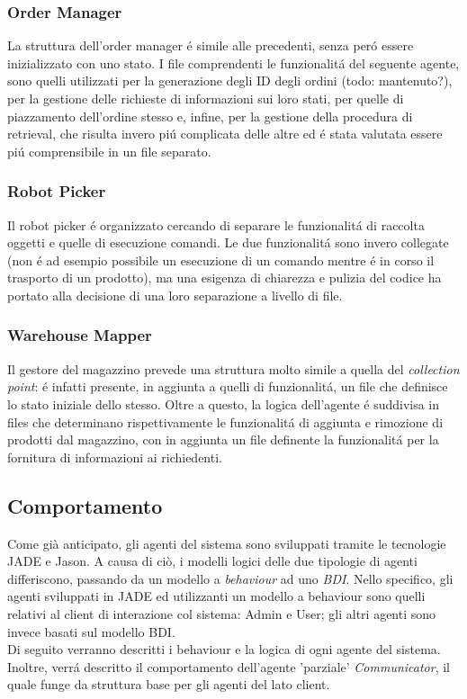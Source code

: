 \subsubsection{Order Manager}
La struttura dell'order manager \'e simile alle precedenti, senza per\'o essere inizializzato con uno stato. I file comprendenti le funzionalit\'a del seguente agente, sono quelli utilizzati per la generazione degli ID degli ordini (todo: mantenuto?), per la gestione delle richieste di informazioni sui loro stati, per quelle di piazzamento dell'ordine stesso e, infine, per la gestione della procedura di retrieval, che risulta invero pi\'u complicata delle altre ed \'e stata valutata essere pi\'u comprensibile in un file separato.%

\subsubsection{Robot Picker}
Il robot picker \'e organizzato cercando di separare le funzionalit\'a di raccolta oggetti e quelle di esecuzione comandi. Le due funzionalit\'a sono invero collegate (non \'e ad esempio possibile un esecuzione di un comando mentre \'e in corso il trasporto di un prodotto), ma una esigenza di chiarezza e pulizia del codice ha portato alla decisione di una loro separazione a livello di file.%

\subsubsection{Warehouse Mapper}
Il gestore del magazzino prevede una struttura molto simile a quella del \textit{collection point}: \'e infatti presente, in aggiunta a quelli di funzionalit\'a, un file che definisce lo stato iniziale dello stesso. Oltre a questo, la logica dell'agente \'e suddivisa in files che determinano rispettivamente le funzionalit\'a di aggiunta e rimozione di prodotti dal magazzino, con in aggiunta un file definente la funzionalit\'a per la fornitura di informazioni ai richiedenti.

\subsection{Comportamento}

Come già anticipato, gli agenti del sistema sono sviluppati tramite le tecnologie JADE e Jason. A causa di ciò, i modelli logici delle due tipologie di agenti differiscono, passando da un modello a \textit{behaviour} ad uno \textit{BDI}. Nello specifico, gli agenti sviluppati in JADE ed utilizzanti un modello a behaviour sono quelli relativi al client di interazione col sistema: Admin e User; gli altri agenti sono invece basati sul modello BDI.\\
Di seguito verranno descritti i behaviour e la logica di ogni agente del sistema. Inoltre, verr\'a descritto il comportamento dell'agente 'parziale' \textit{Communicator}, il quale funge da struttura base per gli agenti del lato client.

